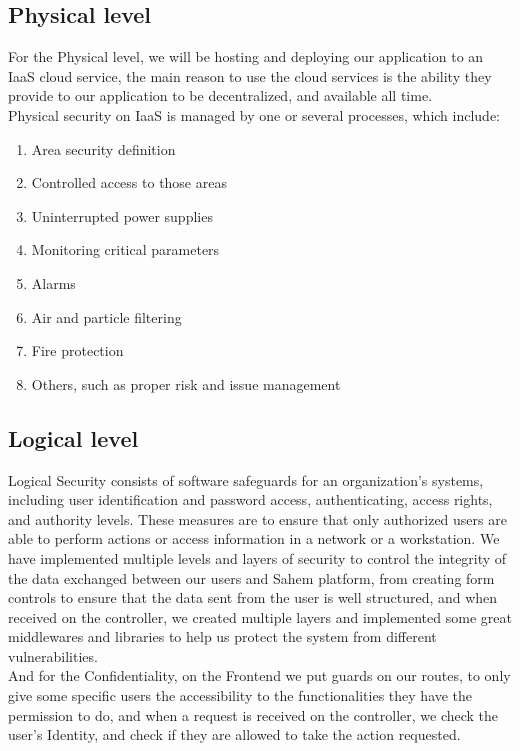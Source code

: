 \subsection{Physical level}
For the Physical level, we will be hosting and deploying our application to an IaaS cloud service, the main reason to use the cloud services is the ability they provide to our application to be decentralized, and available all time.\\
Physical security on IaaS is managed by one or several processes, which include:
\begin{enumerate}
      \item 
      Area security definition
      \item 
      Controlled access to those areas
      \item 
      Uninterrupted power supplies
      \item 
      Monitoring critical parameters
      \item 
      Alarms
      \item 
      Air and particle filtering
      \item 
      Fire protection
      \item 
      Others, such as proper risk and issue management
\end{enumerate}
\subsection{Logical level}
Logical Security consists of software safeguards for an organization's systems, including user identification and password access, authenticating, access rights, and authority levels. These measures are to ensure that only authorized users are able to perform actions or access information in a network or a workstation.
We have implemented multiple levels and layers of security to control the integrity of the data exchanged between our users and Sahem platform, from creating form controls to ensure that the data sent from the user is well structured, and when received on the controller, we created multiple layers and implemented some great middlewares and libraries to help us protect the system from different vulnerabilities.\\
And for the Confidentiality, on the Frontend we put guards on our routes, to only give some specific users the accessibility to the functionalities they have the permission to do, and when a request is received on the controller, we check the user's Identity, and check if they are allowed to take the action requested.
